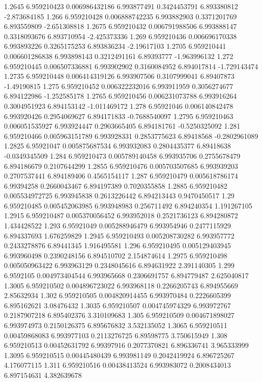 {1.2645 6.959210423 0.006986432186 6.993877491 0.3424453791 6.893380812 -2.873684185
1.266 6.959210428 0.006888742235 6.993882903 0.3371201769 6.893559809 -2.651308818
1.2675 6.959210432 0.006791988506 6.993888147 0.3318093676 6.893710954 -2.425373336
1.269 6.959210436 0.006696170338 6.993893226 0.3265175253 6.893836234 -2.19617103
1.2705 6.959210441 0.006601286838 6.993898143 0.3212491161 6.89393777 -1.963996132
1.272 6.959210445 0.006507336881 6.993902902 0.3160084952 6.894017814 -1.729143474
1.2735 6.959210448 0.006414319126 6.993907506 0.3107999041 6.89407873 -1.49190815
1.275 6.959210452 0.006322232016 6.993911959 0.3056274677 6.894122986 -1.252585178
1.2765 6.959210456 0.006231073788 6.993916264 0.3004951923 6.894153142 -1.011469172
1.278 6.95921046 0.006140842478 6.993920426 0.2954069627 6.894171833 -0.7688540097
1.2795 6.959210463 0.006051535927 6.993924447 0.2903665405 6.894181761 -0.5250325092
1.281 6.959210466 0.005963151789 6.993928331 0.2853775623 6.89418568 -0.2802961089
1.2825 6.95921047 0.005875687534 6.993932083 0.2804435377 6.89418638 -0.0349345509
1.284 6.959210473 0.005789140458 6.993935706 0.2755678479 6.894186679 0.2107644299
1.2855 6.959210476 0.005703507685 6.993939203 0.2707537441 6.894189406 0.4565154117
1.287 6.959210479 0.005618786174 6.99394258 0.2660043467 6.894197389 0.7020355858
1.2885 6.959210482 0.005534972725 6.993945838 0.2613226442 6.894213443 0.9470450517
1.29 6.959210485 0.005452063985 6.993948983 0.256711492 6.894240354 1.191267105
1.2915 6.959210487 0.005370056452 6.993952018 0.2521736123 6.894280872 1.434428522
1.293 6.95921049 0.005288946479 6.993954946 0.2477115929 6.894337693 1.676259829
1.2945 6.959210493 0.005208730282 6.993957772 0.2433278876 6.89441345 1.916495581
1.296 6.959210495 0.005129403945 6.993960498 0.2390248156 6.894510702 2.154874614
1.2975 6.959210498 0.005050963422 6.993963129 0.2348045616 6.894631922 2.391140305
1.299 6.9592105 0.004973404544 6.993965668 0.2306691757 6.894779487 2.625040817
1.3005 6.959210502 0.004896723022 6.993968118 0.2266205743 6.894955669 2.85632934
1.302 6.959210505 0.004820914455 6.993970484 0.2226605399 6.895162621 3.08476432
1.3035 6.959210507 0.004745974329 6.993972767 0.2187907218 6.895402376 3.310109683
1.305 6.959210509 0.004671898027 6.993974973 0.2150126375 6.895676832 3.532135052
1.3065 6.959210511 0.00459868083 6.993977103 0.2113276725 6.89598775 3.750615949
1.308 6.959210513 0.00452631792 6.99397916 0.2077370821 6.896336741 3.965333999
1.3095 6.959210515 0.00445480439 6.993981149 0.2042419924 6.896725267 4.176077115
1.311 6.959210516 0.00438413524 6.993983072 0.2008434013 6.897154631 4.382639678
}
